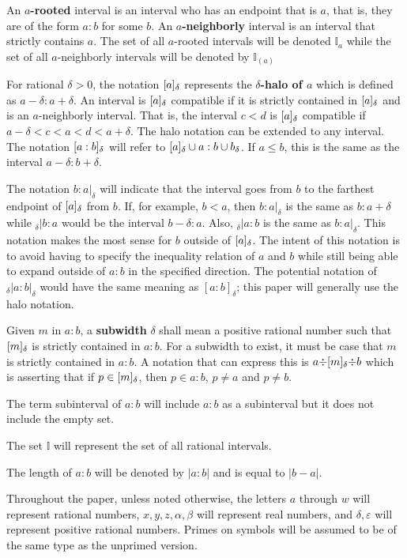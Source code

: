 \documentclass[12pt]{article}
\begin{document}
An \textbf{$a$-rooted} interval is an interval who has an endpoint that is $a$, that is, they are of the form $a:b$ for some $b$. An  \textbf{$a$-neighborly} interval is an interval that strictly contains $a$. The set of all $a$-rooted intervals will be denoted $\mathbb{I}_a$ while the set of all $a$-neighborly intervals will be denoted by $\mathbb{I}_{(a)}$

For rational $\delta > 0$, the notation $[a]_{\delta}$ represents the \textbf{$\delta$-halo of $a$} which is defined as $a -\delta : a+ \delta$. An interval is $[a]_{\delta}$ compatible if it is strictly contained in $[a]_{\delta}$ and is an $a$-neighborly interval. That is, the interval $c \lt d$ is $[a]_{\delta}$ compatible if $a- \delta < c < a < d < a+ \delta$. The halo notation can be extended to any interval. The notation $[a:b]_{\delta}$ will refer to $[a]_{\delta} \cup a:b \cup b_\delta$. If $a \leq b$, this is the same as the interval $a-\delta:b+\delta$. 

The notation $b:a|_\delta$ will indicate that the interval goes from $b$ to the farthest endpoint of $[a]_{\delta}$ from $b$. If, for example, $b < a$, then $b:a|_\delta$ is the same as $b:a+\delta$ while ${}_\delta|b:a$ would be the interval $b-\delta:a$. Also, ${}_\delta|a : b$ is the same as $b:a|_\delta$. This notation makes the most sense for $b$ outside of $[a]_{\delta}$. The intent of this notation is to avoid having to specify the inequality relation of $a$ and $b$ while still being able to expand outside of $a:b$ in the specified direction. The potential notation of ${}_\delta | a:b|_\delta$ would have the same meaning as $[a:b]_\delta$; this paper will generally use the halo notation. 

Given $m$ in $a : b$, a \textbf{subwidth} $\delta$ shall mean a positive rational number such that $[m]_{\delta}$ is strictly contained in $a:b$. For a subwidth to exist, it must be case that $m$ is strictly contained in $a:b$. A notation that can express this is $a \mathord{\div} [m]_{\delta} \mathord{\div} b$ which is asserting that if $p \in [m]_{\delta}$, then $p \in a:b$, $p \neq a$ and $p \neq b$. 

The term subinterval of $a:b$ will include $a:b$ as a subinterval but it does not include the empty set. 

The set $\mathbb{I}$ will represent the set of all rational intervals. 

The length of $a:b$ will be denoted by $|a:b|$ and is equal to $|b-a|$.

Throughout the paper, unless noted otherwise, the letters $a$ through $w$ will represent rational numbers, $x, y, z, \alpha, \beta$ will represent real numbers, and $\delta, \varepsilon$ will represent positive rational numbers. Primes on symbols will be assumed to be of the same type as the unprimed version. 
\end{document}
